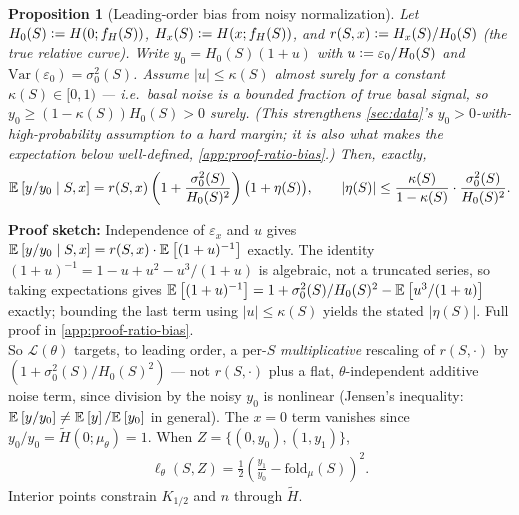 \documentclass{article}
\theoremstyle{plain}
\newtheorem{prop}{Proposition}
\theoremstyle{remark}
\newenvironment{proofSketch}{\noindent\textbf{Proof sketch:}}{\hfill\\}
\begin{document}
\begin{prop}[Leading-order bias from noisy normalization]\label{prop:ratio-bias}
Let $H_0(S)\vcentcolon= H(0;f_H(S))$, $H_x(S)\vcentcolon= H(x;f_H(S))$, and $r(S,x)\vcentcolon= H_x(S)/H_0(S)$ (the true relative curve). Write $y_0 = H_0(S)(1+u)$ with $u\vcentcolon=\varepsilon_0/H_0(S)$ and $\mathrm{Var}(\varepsilon_0)=\sigma_0^2(S)$. Assume $|u|\le\kappa(S)$ almost surely for a constant $\kappa(S)\in[0,1)$ — i.e.\ basal noise is a bounded fraction of true basal signal, so $y_0\ge(1-\kappa(S))H_0(S)>0$ surely. (This strengthens \cref{sec:data}'s $y_0>0$-with-high-probability assumption to a hard margin; it is also what makes the expectation below well-defined, \cref{app:proof-ratio-bias}.) Then, exactly,
\[
    \mathbb{E}_{}\left[{y/y_0 \mid S,x}\right] = r(S,x)\left(1+\frac{\sigma_0^2(S)}{H_0(S)^2}\right)\big(1+\eta(S)\big), \qquad |\eta(S)| \le \frac{\kappa(S)}{1-\kappa(S)}\cdot\frac{\sigma_0^2(S)}{H_0(S)^2}.
\]
\end{prop}
\begin{proofSketch}
Independence of $\varepsilon_x$ and $u$ gives $\mathbb{E}_{}\left[{y/y_0\mid S,x}\right] = r(S,x)\cdot\mathbb{E}_{}\left[{(1+u)^{-1}}\right]$ exactly. The identity $(1+u)^{-1}=1-u+u^2-u^3/(1+u)$ is algebraic, not a truncated series, so taking expectations gives $\mathbb{E}_{}\left[{(1+u)^{-1}}\right] = 1+\sigma_0^2(S)/H_0(S)^2-\mathbb{E}_{}\left[{u^3/(1+u)}\right]$ exactly; bounding the last term using $|u|\le\kappa(S)$ yields the stated $|\eta(S)|$. Full proof in \cref{app:proof-ratio-bias}.
\end{proofSketch}
So $\mathcal{L}(\theta)$ targets, to leading order, a per-$S$ \emph{multiplicative} rescaling of $r(S,\cdot)$ by $(1+\sigma_0^2(S)/H_0(S)^2)$ — not $r(S,\cdot)$ plus a flat, $\theta$-independent additive noise term, since division by the noisy $y_0$ is nonlinear (Jensen's inequality: $\mathbb{E}_{}\left[{y/y_0}\right]\neq\mathbb{E}_{}\left[{y}\right]/\mathbb{E}_{}\left[{y_0}\right]$ in general).
The $x=0$ term vanishes since $y_0/y_0=\widetilde{H}(0;\mu_{\theta})=1$.
When $Z=\{(0,y_0),(1,y_1)\}$,
\begin{align*}
    \ell_{\theta}(S,Z) = \tfrac12\left(\frac{y_1}{y_0} - \mathrm{fold}_\mu(S)\right)^2.
\end{align*}
Interior points constrain $K_{1/2}$ and $n$ through $\widetilde{H}$.
\end{document}
